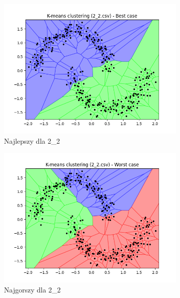 \documentclass[12pt]{article}
\begin{document}
\begin{figure}[H]
\begin{subfigure}[b]{0.24\textwidth}
        \includegraphics[width=\linewidth]{img/exp_1/kmeans/2_2_best.png}
        \caption{Najlepszy dla 2\_2}
    \end{subfigure}
    \hfill
    \begin{subfigure}[b]{0.24\textwidth}
        \includegraphics[width=\linewidth]{img/exp_1/kmeans/2_2_worst.png}
        \caption{Najgorszy dla 2\_2}
    \end{subfigure}
    \hfill
    \begin{subfigure}[b]{0.24\textwidth}

\end{subfigure}
\end{figure}
\end{document}
